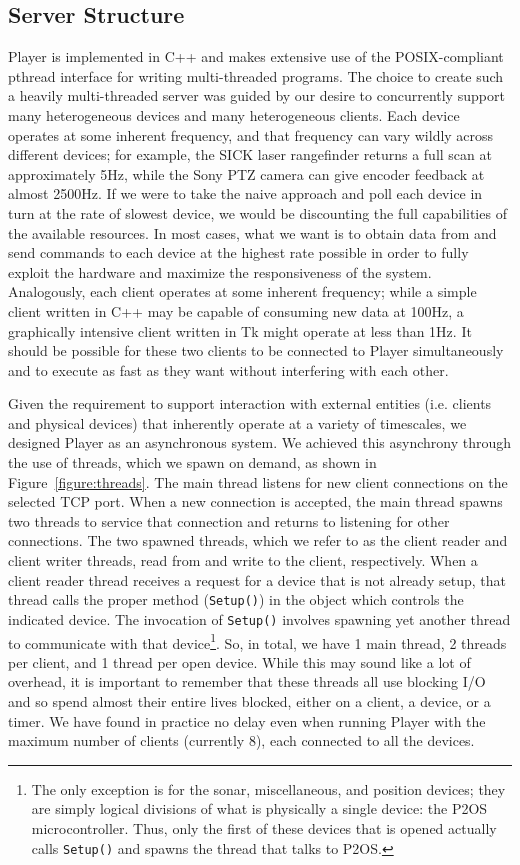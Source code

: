 \documentclass[11pt]{article}
\begin{document}
\subsection{Server Structure}
Player is implemented in C++ and makes extensive use of the POSIX-compliant
pthread interface for writing multi-threaded programs. 
The choice to create such a heavily multi-threaded server was guided
by our desire to concurrently support many heterogeneous devices and many
heterogeneous clients.  Each device operates at some inherent frequency, 
and that frequency can vary wildly across different devices;
for example, the SICK laser rangefinder returns a full scan at approximately
5Hz, while the Sony PTZ camera can give encoder feedback at almost
2500Hz. If we were to take the naive approach and poll each device in turn
at the rate of slowest device, we would be discounting the full capabilities
of the available resources.  In most cases, what we want is to obtain data 
from and send commands to each device at the highest rate possible in order 
to fully exploit the hardware and maximize the responsiveness of the system.  
Analogously, each client operates at some inherent frequency;
while a simple client written in C++ may be capable of consuming new data 
at 100Hz, a graphically intensive client written in Tk might operate
at less than 1Hz.  It should be possible for these two clients to be 
connected to Player simultaneously and to execute as fast as they want
without interfering with each other.

Given the requirement to support interaction with external entities
(i.e. clients and physical devices) that inherently operate at a variety 
of timescales, we designed Player as an asynchronous system.  
We achieved this asynchrony through the use of threads, which we spawn
on demand, as shown in Figure~\ref{figure:threads}.  
The main thread
listens for new client connections on the selected TCP port.  When a new
connection is accepted, the main thread spawns two threads to service
that connection and returns to listening for other connections.  The
two spawned threads, which we refer to as the client reader and client writer
threads, read
from and write to the client, respectively.  When a client reader
thread receives a request for a device that is not already setup, that
thread calls the proper method ({\tt Setup()}) in the object which controls 
the indicated device.  The invocation of {\tt Setup()} 
involves spawning yet another thread to communicate with that 
device\footnote{The only
exception is for the sonar, miscellaneous, and position devices; they are
simply logical divisions of what is physically a single device: the P2OS
microcontroller.  Thus, only the first of these devices that is opened 
actually calls 
{\tt Setup()} and spawns the thread that talks to P2OS.}.
So, in total, we
have 1 main thread, 2 threads per client, and 1 thread per open device.
While this may sound like a lot of overhead, it is important to remember
that these threads all use blocking I/O and so spend almost their entire
lives blocked, either on a client, a device, or a timer.
We have found in practice no delay even when running Player with
the maximum number of clients (currently 8), each connected to all 
the devices.
\end{document}
